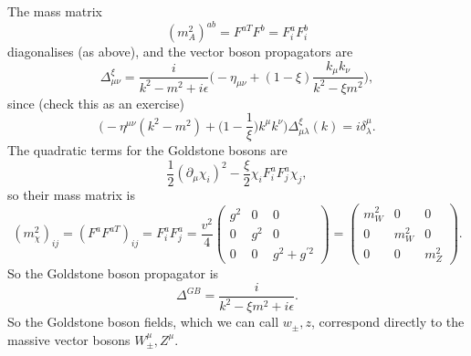 The mass matrix 
\begin{equation}
(m_A^2)^{ab} = F^{a T}F^b = F_i^aF_i^b
\end{equation}
diagonalises (as above), and the vector boson propagators are
\begin{equation}
\Delta_{\mu \nu }^\xi = \frac{i}{k^2 - m^2 + i\epsilon} \bigg(-\eta_{\mu \nu} + (1-\xi) \frac{k_\mu k_\nu}{k^2 -\xi m^2} \bigg),
\end{equation}
since (check this as an exercise)
\begin{equation}
\bigg( -\eta^{\mu \nu}(k^2 - m^2) + \bigg( 1 - \frac{1}{\xi}\bigg)k^\mu k^\nu \bigg) \Delta_{\mu \lambda}^\xi(k) = i \delta_\lambda^\mu.
\end{equation}
The quadratic terms for the Goldstone bosons are
\begin{equation}
\frac{1}{2}(\partial_\mu \chi_i)^2 - \frac{\xi}{2} \chi_i F_i^a F_j^a \chi_j,
\end{equation}
so their mass matrix is
\begin{equation}
(m_\chi^2)_{ij} = (F^a F^{a T})_{ij} = F^a_i F^a_j = \frac{v^2}{4}
\begin{pmatrix}
g^2 & 0 & 0 \\
0 & g^2 & 0 \\
0 & 0 & g^2 + g^{\prime 2} 
\end{pmatrix}
= \begin{pmatrix}
m_W^2 & 0 & 0 \\
0 & m_W^2 & 0 \\
0 & 0 & m_Z^2
\end{pmatrix}.
\end{equation}
So the Goldstone boson propagator is
\begin{equation}
\Delta^{GB} = \frac{i}{k^2 - \xi m^2 + i\epsilon}.
\end{equation}
So the Goldstone boson fields, which we can call $w_{\pm}, z$, correspond directly to the massive vector bosons $W^\mu_{\pm}, Z^\mu$.

